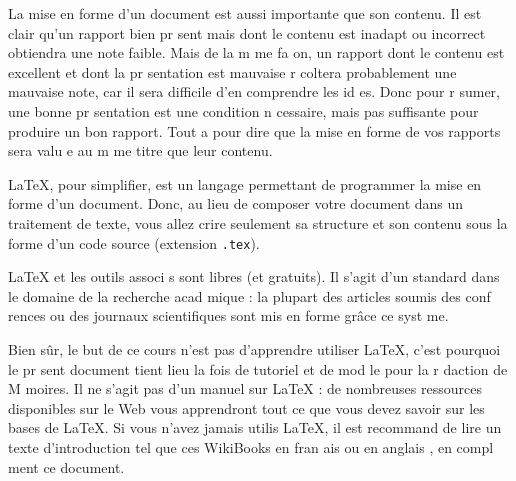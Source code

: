 \documentclass{article}
\begin{document}
La mise en forme d'un document est aussi importante que son contenu. Il est clair qu'un rapport bien pr sent  mais dont le contenu est inadapt  ou incorrect obtiendra une note faible. Mais de la m me fa on, un rapport dont le contenu est excellent et dont la pr sentation est mauvaise r coltera probablement une mauvaise note, car il sera difficile d'en comprendre les id es. Donc pour r sumer, une bonne pr sentation est une condition n cessaire, mais pas suffisante pour produire un bon rapport. Tout  a pour dire que la mise en forme de vos rapports sera  valu e au m me titre que leur contenu.
	
\LaTeX{}, pour simplifier, est un langage permettant de programmer la mise en forme d'un document. Donc, au lieu de composer votre document dans un traitement de texte, vous allez  crire seulement sa structure et son contenu sous la forme d'un code source (extension \texttt{.tex}). 
	
\LaTeX{} et les outils associ s sont libres (et gratuits). Il s'agit d'un standard dans le domaine de la recherche acad mique : la plupart des articles soumis   des conf rences ou   des journaux scientifiques sont mis en forme gr\^ace   ce syst me.
	
Bien s\^ur, le but de ce cours n'est pas d'apprendre   utiliser \LaTeX{}, c'est pourquoi le pr sent document tient lieu   la fois de tutoriel et de mod le pour la r daction de M moires. Il ne s'agit pas d'un manuel sur \LaTeX{} : de nombreuses ressources disponibles sur le Web vous apprendront tout ce que vous devez savoir sur les bases de \LaTeX{}. Si vous n'avez jamais utilis  \LaTeX{}, il est recommand  de lire un texte d'introduction tel que ces WikiBooks en fran ais \cite{Wikibooks2010} ou en anglais \cite{Wikibooks2011}, en compl ment   ce document.
	
\end{document}
